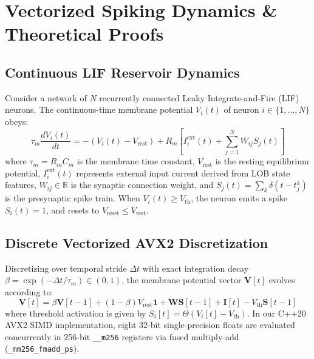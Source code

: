 \documentclass[journal,twocolumn,10pt]{article}
\begin{document}
\section{Vectorized Spiking Dynamics \& Theoretical Proofs}

\subsection{Continuous LIF Reservoir Dynamics}
Consider a network of $N$ recurrently connected Leaky Integrate-and-Fire (LIF) neurons. The continuous-time membrane potential $V_i(t)$ of neuron $i \in \{1, \dots, N\}$ obeys:
\begin{equation}
\label{eq:lif_cont}
\tau_m \frac{d V_i(t)}{d t} = -(V_i(t) - V_{\text{rest}}) + R_m \left[ I_i^{\text{ext}}(t) + \sum_{j=1}^N W_{i j} S_j(t) \right]
\end{equation}
where $\tau_m = R_m C_m$ is the membrane time constant, $V_{\text{rest}}$ is the resting equilibrium potential, $I_i^{\text{ext}}(t)$ represents external input current derived from LOB state features, $W_{i j} \in \mathbb{R}$ is the synaptic connection weight, and $S_j(t) = \sum_k \delta(t - t_j^k)$ is the presynaptic spike train. When $V_i(t) \ge V_{\text{th}}$, the neuron emits a spike $S_i(t) = 1$, and resets to $V_{\text{reset}} \le V_{\text{rest}}$.

\subsection{Discrete Vectorized AVX2 Discretization}
Discretizing over temporal stride $\Delta t$ with exact integration decay $\beta = \exp(-\Delta t / \tau_m) \in (0, 1)$, the membrane potential vector $\mathbf{V}[t]$ evolves according to:
\begin{equation}
\label{eq:lif_disc}
\mathbf{V}[t] = \beta \mathbf{V}[t-1] + (1 - \beta) V_{\text{rest}} \mathbf{1} + \mathbf{W} \mathbf{S}[t-1] + \mathbf{I}[t] - V_{\text{th}} \mathbf{S}[t-1]
\end{equation}
where threshold activation is given by $S_i[t] = \Theta(V_i[t] - V_{\text{th}})$. In our C++20 AVX2 SIMD implementation, eight 32-bit single-precision floats are evaluated concurrently in 256-bit \texttt{\_\_m256} registers via fused multiply-add (\texttt{\_mm256\_fmadd\_ps}).
\end{document}
